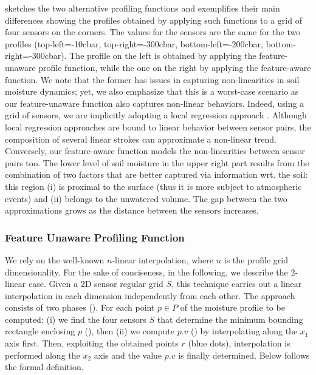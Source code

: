  sketches the two alternative profiling functions and
 exemplifies their main differences showing the profiles obtained by applying such functions to a grid of four sensors on the corners.
The values for the sensors are the same for the two profiles (top-left=-10cbar, top-right=-300cbar, bottom-left=-200cbar, bottom-right=-300cbar).
The profile on the left is obtained by applying the feature-unaware profile function, while the one on the right by applying the feature-aware function.
We note that the former has issues in capturing non-linearities in soil moisture dynamics; yet, we also emphasize that this is a worst-case scenario as our feature-unaware function also captures non-linear behaviors.
Indeed, using a grid of sensors, we are implicitly adopting a local regression approach \cite{loader2006local,cleveland1988locally}.
Although local regression approaches are bound to linear behavior between sensor pairs, the composition of several linear strokes can approximate a non-linear trend.
Conversely, our feature-aware function models the non-linearities between sensor pairs too.
The lower level of soil moisture in the upper right part results from the combination of two factors that are better captured via information wrt. the soil: this region (i) is proximal to the surface (thus it is more subject to atmospheric events) and (ii) belongs to the unwatered volume.
The gap between the two approximations grows as the distance between the sensors increases.

\subsubsection{Feature Unaware Profiling Function}

We rely on the well-known $n$-linear interpolation, where $n$ is the profile grid dimensionality.
For the sake of conciseness, in the following, we describe the $2$-linear case. 
Given a 2D sensor regular grid $S$, this technique carries out a linear interpolation in each dimension independently from each other.
The approach consists of two phases ().
For each point $p \in P$ of the moisture profile to be computed: (i) we find the four sensors $S$ that determine the minimum bounding rectangle enclosing $p$ (), then (ii) we compute $p.v$ () by interpolating along the $x_1$ axis first. Then, exploiting the obtained points $r$  (blue dots), interpolation is performed along the $x_2$ axis and the value $p.v$ is finally determined.
Below follows the formal definition.

